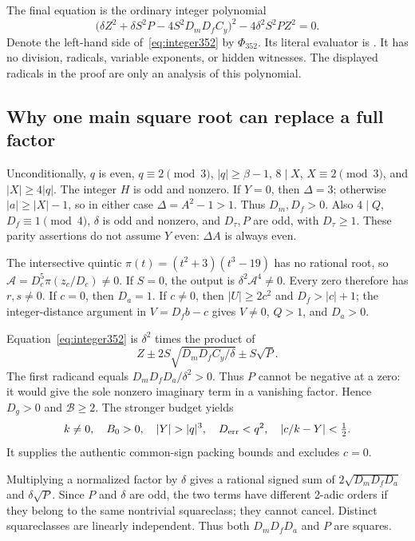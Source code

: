 The final equation is the ordinary integer polynomial
\begin{equation}\label{eq:integer352}
 \boxed{\bigl(\delta Z^2+\delta S^2P-4S^2D_mD_fC_y\bigr)^2
             -4\delta^2S^2PZ^2=0.}
\end{equation}
Denote the left-hand side of~\eqref{eq:integer352} by $\Phi_{352}$.
Its literal evaluator is
.
It has no division, radicals, variable exponents, or hidden witnesses.
The displayed radicals in the proof are only an analysis of this polynomial.

\subsection{Why one main square root can replace a full factor}
Unconditionally, $q$ is even, $q\equiv2\pmod3$, $|q|\ge\beta-1$,
$8\mid X$, $X\equiv2\pmod3$, and $|X|\ge4|q|$.
The integer $H$ is odd and nonzero. If $Y=0$, then $\Delta=3$;
otherwise $|a|\ge|X|-1$, so in either case $\Delta=A^2-1>1$.
Thus $D_m,D_f>0$. Also $4\mid Q$, $D_f\equiv1\pmod4$,
$\delta$ is odd and nonzero, and $D_\tau,P$ are odd, with $D_\tau\ge1$.
These parity assertions do not assume $Y$ even: $\Delta A$ is always even.

The intersective quintic $\pi(t)=(t^2+3)(t^3-19)$ has no rational root,
so $\mathcal A=D_c^5\pi(z_c/D_c)\ne0$. If $S=0$, the output is
$\delta^2\mathcal A^4\ne0$. Every zero therefore has $r,s\ne0$.
If $c=0$, then $D_a=1$. If $c\ne0$, then $|U|\ge2c^2$ and
$D_f>|c|+1$; the integer-distance argument in
$V=D_fb-c$ gives $V\ne0$, $Q>1$, and $D_a>0$.

Equation~\eqref{eq:integer352} is $\delta^2$ times the product of
\[
 Z\pm2S\sqrt{D_mD_fC_y/\delta}\pm S\sqrt P.
\]
The first radicand equals $D_mD_fD_a/\delta^2>0$.
Thus $P$ cannot be negative at a zero: it would give the sole nonzero
imaginary term in a vanishing factor. Hence $D_g>0$ and $\mathcal B\ge2$.
The stronger budget yields
\[
 k\ne0,\quad B_0>0,\quad |Y|>|q|^3,\quad
 D_{\rm err}<q^2,\quad |c/k-Y|<\tfrac12.
\]
It supplies the authentic common-sign packing bounds and excludes $c=0$.

Multiplying a normalized factor by $\delta$ gives a rational signed sum
of $2\sqrt{D_mD_fD_a}$ and $\delta\sqrt P$.
Since $P$ and $\delta$ are odd, the two terms have different 2-adic
orders if they belong to the same nontrivial squareclass; they cannot
cancel. Distinct squareclasses are linearly independent. Thus both
$D_mD_fD_a$ and $P$ are squares.

